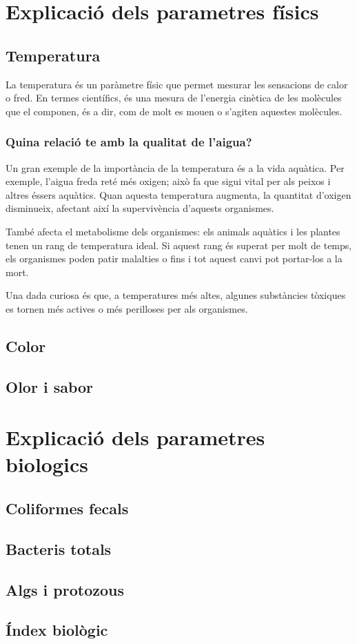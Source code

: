 \section{Explicació dels parametres físics}

\subsection{Temperatura} \label{subsec:temperatura}
La temperatura és un paràmetre físic que permet mesurar les sensacions de calor o fred. En termes científics, és una mesura de l’energia cinètica de les molècules que el componen, és a dir, com de molt es mouen o s’agiten aquestes molècules.
\subsubsection{Quina relació te amb la qualitat de l'aigua?}
Un gran exemple de la importància de la temperatura és a la vida aquàtica. Per exemple, l’aigua freda reté més oxigen; això fa que sigui vital per als peixos i altres éssers aquàtics. Quan aquesta temperatura augmenta, la quantitat d’oxigen disminueix, afectant així la supervivència d’aquests organismes.

També afecta el metabolisme dels organismes: els animals aquàtics i les plantes tenen un rang de temperatura ideal. Si aquest rang és superat per molt de temps, els organismes poden patir malalties o fins i tot aquest canvi pot portar-los a la mort.

Una dada curiosa és que, a temperatures més altes, algunes substàncies tòxiques es tornen més actives o més perilloses per als organismes.
\subsection{Color} \label{subsec:color}

\subsection{Olor i sabor} \label{subsec:olorisabor}

\section{Explicació dels parametres biologics}

\subsection{Coliformes fecals} \label{subsec:coliformes}

\subsection{Bacteris totals} \label{subsec:bacteris}

\subsection{Algs i protozous} \label{subsec:algsiprotozous}

\subsection{Índex biològic} \label{subsec:indexbiologic}


